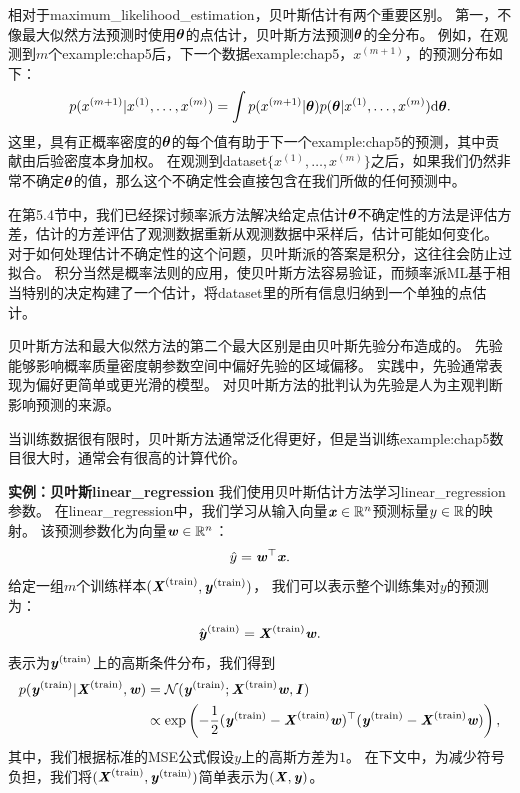 相对于\gls{maximum_likelihood_estimation}，贝叶斯估计有两个重要区别。
第一，不像最大似然方法预测时使用$\boldsymbol{\theta}$的点估计，贝叶斯方法预测$\boldsymbol{\theta}$的全分布。
例如，在观测到$m$个\gls{example:chap5}后，下一个数据\gls{example:chap5}，$x^{(m+1)}$，的预测分布如下：
\begin{equation}
    p(x^{(m+1)} | x^{(1)},\dots,x^{(m)}) = 
    \int p(x^{(m+1)} | \boldsymbol{\theta}) p(\boldsymbol{\theta} | x^{(1)},\dots,x^{(m)}) 
        \mathrm{d}\boldsymbol{\theta} .
\end{equation}
这里，具有正概率密度的$\boldsymbol{\theta}$的每个值有助于下一个\gls{example:chap5}的预测，其中贡献由后验密度本身加权。
在观测到\gls{dataset}$\{ x^{(1)},\dots,x^{(m)}\}$之后，如果我们仍然非常不确定$\boldsymbol{\theta}$的值，那么这个不确定性会直接包含在我们所做的任何预测中。


在第5.4节中，我们已经探讨频率派方法解决给定点估计$\boldsymbol{\theta}$不确定性的方法是评估方差，估计的方差评估了观测数据重新从观测数据中采样后，估计可能如何变化。
对于如何处理估计不确定性的这个问题，贝叶斯派的答案是积分，这往往会防止过拟合。
积分当然是概率法则的应用，使贝叶斯方法容易验证，而频率派\gls{ML}基于相当特别的决定构建了一个估计，将\gls{dataset}里的所有信息归纳到一个单独的点估计。

贝叶斯方法和最大似然方法的第二个最大区别是由贝叶斯先验分布造成的。
先验能够影响概率质量密度朝参数空间中偏好先验的区域偏移。
实践中，先验通常表现为偏好更简单或更光滑的模型。
对贝叶斯方法的批判认为先验是人为主观判断影响预测的来源。

当训练数据很有限时，贝叶斯方法通常泛化得更好，但是当训练\gls{example:chap5}数目很大时，通常会有很高的计算代价。

\textbf{实例：贝叶斯\gls{linear_regression}} \quad 我们使用贝叶斯估计方法学习\gls{linear_regression}参数。
在\gls{linear_regression}中，我们学习从输入向量$\boldsymbol{\mathit{x}}\in\mathbb{R}^n$预测标量$y\in\mathbb{R}$的映射。
该预测参数化为向量$\boldsymbol{\mathit{w}} \in \mathbb{R}^n$：
\begin{equation}
    \hat{y} = \boldsymbol{\mathit{w}}^\top \boldsymbol{\mathit{x}} .
\end{equation}
给定一组$m$个训练样本$(\boldsymbol{\mathit{X}}^{(\text{train})}, \boldsymbol{\mathit{y}}^{(\text{train})})$，
我们可以表示整个训练集对$y$的预测为：
\begin{equation}
    \hat{\boldsymbol{\mathit{y}}}^{(\text{train})} = \boldsymbol{\mathit{X}}^{(\text{train})} \boldsymbol{\mathit{w}} .
\end{equation}
表示为$\boldsymbol{\mathit{y}}^{(\text{train})}$上的高斯条件分布，我们得到
\begin{align}
    p(\boldsymbol{\mathit{y}}^{(\text{train})} | \boldsymbol{\mathit{X}}^{(\text{train})}, \boldsymbol{\mathit{w}}) &= 
    \mathcal{N}( \boldsymbol{\mathit{y}}^{(\text{train})}; \boldsymbol{\mathit{X}}^{(\text{train})}\boldsymbol{\mathit{w}}, \boldsymbol{\mathit{I}} ) \\
    & \propto \exp\left( 
        -\frac{1}{2}( \boldsymbol{\mathit{y}}^{(\text{train})} - \boldsymbol{\mathit{X}}^{(\text{train})}\boldsymbol{\mathit{w}} )^\top
        ( \boldsymbol{\mathit{y}}^{(\text{train})} - \boldsymbol{\mathit{X}}^{(\text{train})}\boldsymbol{\mathit{w}} )
    \right),
\end{align}
其中，我们根据标准的MSE公式假设$y$上的高斯方差为$1$。
在下文中，为减少符号负担，我们将$(\boldsymbol{\mathit{X}}^{(\text{train})}, \boldsymbol{\mathit{y}}^{(\text{train})})$简单表示为$(\boldsymbol{\mathit{X}}, \boldsymbol{\mathit{y}})$。

